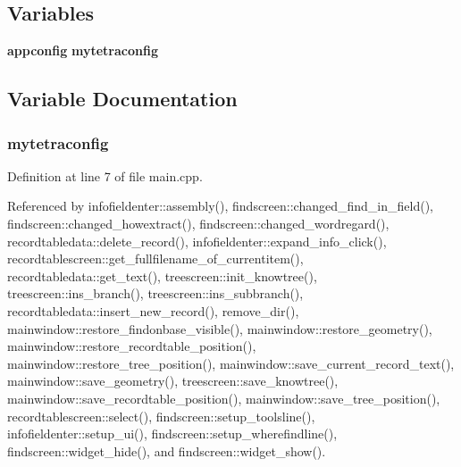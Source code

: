 \subsection*{Variables}
\begin{CompactItemize}
\item 
{\bf appconfig} {\bf mytetraconfig}
\end{CompactItemize}


\subsection{Variable Documentation}
\subsubsection{ {\bf mytetraconfig}}\label{findscreen_8cpp_69bd0a7d678d494effdef51808501712}




Definition at line 7 of file main.cpp.

Referenced by infofieldenter::assembly(), findscreen::changed\_\-find\_\-in\_\-field(), findscreen::changed\_\-howextract(), findscreen::changed\_\-wordregard(), recordtabledata::delete\_\-record(), infofieldenter::expand\_\-info\_\-click(), recordtablescreen::get\_\-fullfilename\_\-of\_\-currentitem(), recordtabledata::get\_\-text(), treescreen::init\_\-knowtree(), treescreen::ins\_\-branch(), treescreen::ins\_\-subbranch(), recordtabledata::insert\_\-new\_\-record(), remove\_\-dir(), mainwindow::restore\_\-findonbase\_\-visible(), mainwindow::restore\_\-geometry(), mainwindow::restore\_\-recordtable\_\-position(), mainwindow::restore\_\-tree\_\-position(), mainwindow::save\_\-current\_\-record\_\-text(), mainwindow::save\_\-geometry(), treescreen::save\_\-knowtree(), mainwindow::save\_\-recordtable\_\-position(), mainwindow::save\_\-tree\_\-position(), recordtablescreen::select(), findscreen::setup\_\-toolsline(), infofieldenter::setup\_\-ui(), findscreen::setup\_\-wherefindline(), findscreen::widget\_\-hide(), and findscreen::widget\_\-show().